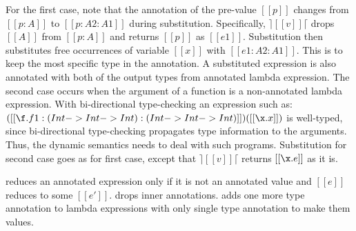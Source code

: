 For the first case, note that the annotation of the pre-value
$[[p]]$ changes from $[[p:A]]$ to $[[p:A2:A1]]$ during substitution.
Specifically,
$\rceil[[v]]\lceil$ drops $[[A]]$ from $[[p:A]]$ and returns $[[p]]$ 
as $[[e1]]$. Substitution then
substitutes free occurrences of variable $[[x]]$ with $[[e1:A2:A1]]$.
This is to keep the most specific type in the annotation. A substituted
expression is also annotated with both of the output types from
annotated lambda expression.
The second case occurs when the
argument of a function is a non-annotated lambda expression.
With bi-directional type-checking an expression such as:
$([[\f.f 1: (Int -> Int -> Int) : (Int -> Int -> Int)]]) ([[\x.x]])$
 
is well-typed, since bi-directional type-checking propagates
type information to the arguments. Thus, the dynamic semantics
needs to deal with such programs. Substitution for second case goes
as for first case, except that $\rceil[[v]]\lceil$ returns $[[\x.e]]$ as it is.

reduces an annotated expression only if it is not an annotated value and $[[e]]$
reduces to some $[[e']]$.  drops inner
annotations.  adds one more type annotation to
lambda expressions with only single type annotation to make them values.

\begin{comment}
\Rref{step-beta} deals with a special case, that occurs when the
argument of a function is a non-annotatted lambda expression.
With bi-directional type-checking an expression such as:
($[[\f.f 1:(Int -> Int -> Int) : (Int -> Int -> Int)]]$)($[[\x.x]]$)
\bruno{example here.} \baber{Done.}
is well-typed, since bi-directional type-checking propagates
type information to the arguments. Thus, the dynamic semantics
needs to deal with such programs.
We emphasize the fact that $[[\x.e]]$ is not a value in \cal.
The rule follows the same approach as
\rref{step-beta} except that both of the input types are kept with
$[[\x.e]]$ during substitution i.e $[[\x.e:A2:A1]]$. \Rref{step-ann}
reduces an annotated expression only if it is not a value and $[[e]]$
reduces to some $[[e']]$. \Rref{step-rmann} drops inner
annotations. \Rref{step-lamann} adds one more type annotation with
lambda expressions having single type annotation to make them values.
\end{comment}


